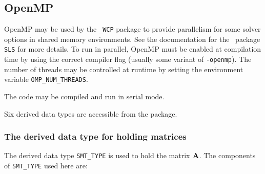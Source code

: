 \documentclass{galahad}
\newcommand{\packagename}{WCP}
\newcommand{\fullpackagename}{\libraryname\_\-\packagename}
\begin{document}

\subsection{OpenMP}
OpenMP may be used by the {\tt \fullpackagename} package to provide 
parallelism for some solver options in shared memory environments.  
See the documentation for the \galahad\ package {\tt SLS} for more details.
To run in parallel, OpenMP 
must be enabled at compilation time by using the correct compiler flag 
(usually some variant of {\tt -openmp}). 
The number of threads may be controlled at runtime
by setting the environment variable {\tt OMP\_NUM\_THREADS}.

\noindent
The code may be compiled and run in serial mode.


\galtypes
Six derived data types are accessible from the package.


\subsubsection{The derived data type for holding matrices}\label{typesmt}
The derived data type {\tt SMT\_TYPE} is used to hold the matrix ${\mathbf{A}}$.
The components of {\tt SMT\_TYPE} used here are:
\end{document}
